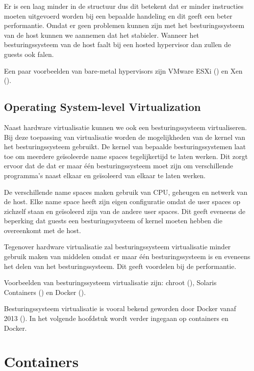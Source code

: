 \documentclass[pdftex,a4paper,12pt,twoside]{report}
\begin{document}
Er is een laag minder in de structuur dus dit betekent dat er minder instructies moeten uitgevoerd worden bij een bepaalde handeling en dit geeft een beter performantie. Omdat er geen problemen kunnen zijn met het besturingssysteem van de host kunnen we aannemen dat het stabieler. Wanneer het besturingssysteem van de host faalt bij een hosted hypervisor dan zullen de guests ook falen.

Een paar voorbeelden van bare-metal hypervisors zijn VMware ESXi (\cite{vmware_vmware_2016}) en Xen (\cite{xen_project_xen_2016}).
\section{Operating System-level Virtualization}

Naast hardware virtualisatie kunnen we ook een besturingssysteem virtualiseren. Bij deze toepassing van virtualisatie worden de mogelijkheden van de kernel van het besturingssysteem gebruikt. De kernel van bepaalde besturingssystemen laat toe om meerdere geïsoleerde name spaces tegelijkertijd te laten werken. Dit zorgt ervoor dat de dat er maar één besturingssysteem moet zijn om verschillende programma's naast elkaar en geïsoleerd van elkaar te laten werken.

De verschillende name spaces maken gebruik van CPU, geheugen en netwerk van de host. Elke name space heeft zijn eigen configuratie omdat de user spaces op zichzelf staan en geïsoleerd zijn van de andere user spaces. Dit geeft eveneens de beperking dat guests een besturingssysteem of kernel moeten hebben die overeenkomt met de host.

Tegenover hardware virtualisatie zal besturingssysteem virtualisatie minder gebruik maken van middelen omdat er maar één besturingssysteem is en eveneens het delen van het besturingssysteem. Dit geeft voordelen bij de performantie.

Voorbeelden van besturingssysteem virtualisatie zijn: chroot (\cite{linux_chroot2_????}), Solaris Containers (\cite{oracle_solaris_2016}) en Docker (\cite{docker_docker_2016}).

Besturingssysteem virtualisatie is vooral bekend geworden door Docker vanaf 2013 (\cite{hykes_future_2013}). In het volgende hoofdstuk wordt verder ingegaan op containers en Docker.

\chapter{Containers}
\label{ch:Containers}
\end{document}
